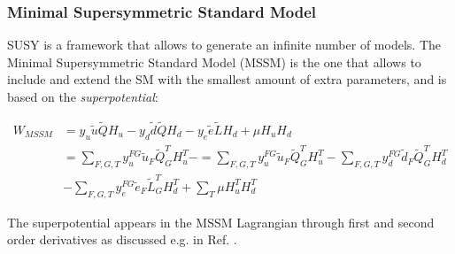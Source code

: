 \subsubsection{Minimal Supersymmetric Standard Model}

SUSY is a framework that allows to generate an infinite number of models. The Minimal Supersymmetric Standard Model (MSSM) is the one that allows to include and extend the SM with the smallest amount of extra parameters, and is based on the \textit{superpotential}:

\begin{equation}
\begin{aligned}
W_{MSSM} & = y_u \tilde{u} \tilde{Q} H_u - y_d \tilde{d}\tilde{Q} H_d - y_e \tilde{e} \tilde{L}H_d + \mu H_u H_d \\  
& = \sum_{F, G, T} y_u^{FG} \tilde{u}_F \tilde{Q}_G^T H_u^T -
 = \sum_{F, G, T} y_u^{FG} \tilde{u}_F \tilde{Q}_G^T H_u^T - 
   \sum_{F, G, T} y_d^{FG} \tilde{d}_F \tilde{Q}_G^T H_d^T   \\ 
   & -
   \sum_{F, G, T} y_e^{FG} \tilde{e}_F\tilde{L}_G^T H_d^T  +
   \sum_{T} \mu H_u^T H_d^T 
\end{aligned}
\label{eq:WMMS}
\end{equation}

The superpotential appears in the MSSM Lagrangian through first and second order derivatives as discussed e.g. in Ref. \cite{Martin:1997ns}.

